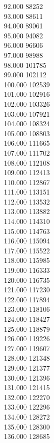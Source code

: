 { 92.000	88252 \\
 93.000	88611 \\
 94.000	89061 \\
 95.000	94082 \\
 96.000	96606 \\
 97.000	98988 \\
 98.000	101785 \\
 99.000	102112 \\
 100.000	102539 \\
 101.000	102916 \\
 102.000	103326 \\
 103.000	107921 \\
 104.000	108324 \\
 105.000	108803 \\
 106.000	111665 \\
 107.000	111702 \\
 108.000	112108 \\
 109.000	112413 \\
 110.000	112867 \\
 111.000	113151 \\
 112.000	113532 \\
 113.000	113882 \\
 114.000	114310 \\
 115.000	114763 \\
 116.000	115094 \\
 117.000	115522 \\
 118.000	115985 \\
 119.000	116333 \\
 120.000	116735 \\
 121.000	117230 \\
 122.000	117894 \\
 123.000	118106 \\
 124.000	118427 \\
 125.000	118879 \\
 126.000	119226 \\
 127.000	119607 \\
 128.000	121348 \\
 129.000	121377 \\
 130.000	121396 \\
 131.000	121415 \\
 132.000	122270 \\
 133.000	122296 \\
 134.000	128272 \\
 135.000	128300 \\
 136.000	128685 \\
}
